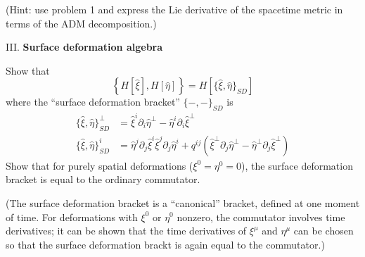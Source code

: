 (Hint: use problem 1 and express the Lie derivative of the spacetime
metric in terms of the ADM decomposition.)

\bigbreak\noindent{}III. \textbf{Surface deformation algebra}\bigbreak

Show that
\begin{equation*}
\left\{H[\widehat{\xi}], H[\widehat{\eta}]\right\} = H[\{\widehat{\xi},\widehat{\eta}\}_{SD}]
\end{equation*}
where the ``surface deformation bracket'' $\{-,-\}_{SD}$ is
\begin{align*}
  \{\widehat{\xi},\widehat{\eta}\}_{SD}^{\bot} &= \widehat{\xi}^{i}\partial_{i}\widehat{\eta}^{\bot}-\widehat{\eta}^{i}\partial_{i}\widehat{\xi}^{\bot}\\
  \{\widehat{\xi},\widehat{\eta}\}_{SD}^{i} &=
  \widehat{\eta}^{j}\partial_{j}\widehat{\xi}^{i}
  \widehat{\xi}^{j}\partial_{j}\widehat{\eta}^{i}
  +q^{ij}\left(\widehat{\xi}^{\bot}\partial_{j}\widehat{\eta}^{\bot} - \widehat{\eta}^{\bot}\partial_{j}\widehat{\xi}^{\bot}\right)
\end{align*}
Show that for purely spatial deformations ($\xi^{0}=\eta^{0}=0$), the
surface deformation bracket is equal to the ordinary commutator.

(The surface deformation bracket is a ``canonical'' bracket, defined at
one moment of time. For deformations with $\xi^{0}$ or $\eta^{0}$
nonzero, the commutator involves time derivatives; it can be shown that
the time derivatives of $\xi^{\mu}$ and $\eta^{\mu}$ can be chosen so
that the surface deformation brackt is again equal to the commutator.)
